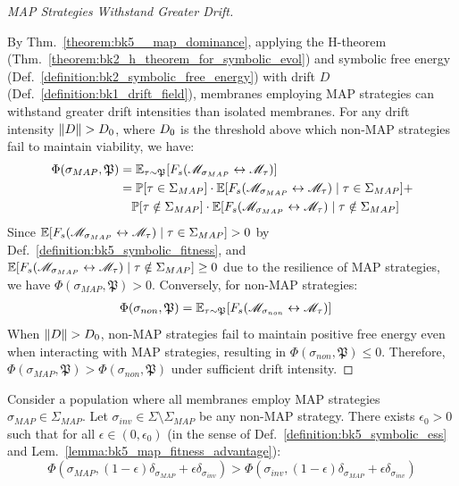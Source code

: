 \begin{proof}[MAP Strategies Withstand Greater Drift]
\label{proof:bk5_map_resistance_to_drift}
\leavevmode

By Thm.~\ref{theorem:bk5__map_dominance}, applying the H-theorem (Thm.~\ref{theorem:bk2_h_theorem_for_symbolic_evol}) and symbolic free energy (Def.~\ref{definition:bk2_symbolic_free_energy}) with drift $D$ (Def.~\ref{definition:bk1_drift_field}), membranes employing MAP strategies can withstand greater drift intensities than isolated membranes. For any drift intensity $\|D\| > D_0$, where $D_0$ is the threshold above which non-MAP strategies fail to maintain viability, we have:
\begin{align}
\Phi(\sigma_{MAP}, \mathfrak{P}) &= \mathbb{E}_{\tau \sim \mathfrak{P}}[F_s(\mathscr{M}_{\sigma_{MAP}} \leftrightarrow \mathscr{M}_\tau)] \\
&= \mathbb{P}[\tau \in \Sigma_{MAP}] \cdot \mathbb{E}[F_s(\mathscr{M}_{\sigma_{MAP}} \leftrightarrow \mathscr{M}_\tau) \mid \tau \in \Sigma_{MAP}] + \\
&\quad \mathbb{P}[\tau \notin \Sigma_{MAP}] \cdot \mathbb{E}[F_s(\mathscr{M}_{\sigma_{MAP}} \leftrightarrow \mathscr{M}_\tau) \mid \tau \notin \Sigma_{MAP}]
\end{align}
Since $\mathbb{E}[F_s(\mathscr{M}_{\sigma_{MAP}} \leftrightarrow \mathscr{M}_\tau) \mid \tau \in \Sigma_{MAP}] > 0$ by Def.~\ref{definition:bk5_symbolic_fitness}, and $\mathbb{E}[F_s(\mathscr{M}_{\sigma_{MAP}} \leftrightarrow \mathscr{M}_\tau) \mid \tau \notin \Sigma_{MAP}] \geq 0$ due to the resilience of MAP strategies, we have $\Phi(\sigma_{MAP}, \mathfrak{P}) > 0$.
Conversely, for non-MAP strategies:
\begin{align}
\Phi(\sigma_{non}, \mathfrak{P}) &= \mathbb{E}_{\tau \sim \mathfrak{P}}[F_s(\mathscr{M}_{\sigma_{non}} \leftrightarrow \mathscr{M}_\tau)]
\end{align}
When $\|D\| > D_0$, non-MAP strategies fail to maintain positive free energy even when interacting with MAP strategies, resulting in $\Phi(\sigma_{non}, \mathfrak{P}) \leq 0$.
Therefore, $\Phi(\sigma_{MAP}, \mathfrak{P}) > \Phi(\sigma_{non}, \mathfrak{P})$ under sufficient drift intensity.
\end{proof}
\begin{lemma}
\label{lemma:bk5_covenant_non_invasibility}
Consider a population where all membranes employ MAP strategies $\sigma_{MAP} \in \Sigma_{MAP}$. Let $\sigma_{inv} \in \Sigma \setminus \Sigma_{MAP}$ be any non-MAP strategy. There exists $\epsilon_0 > 0$ such that for all $\epsilon \in (0, \epsilon_0)$ (in the sense of Def.~\ref{definition:bk5_symbolic_ess} and Lem.~\ref{lemma:bk5_map_fitness_advantage}):
\begin{equation}
\Phi(\sigma_{MAP}, (1-\epsilon)\delta_{\sigma_{MAP}} + \epsilon\delta_{\sigma_{inv}}) > \Phi(\sigma_{inv}, (1-\epsilon)\delta_{\sigma_{MAP}} + \epsilon\delta_{\sigma_{inv}})
\end{equation}
\end{lemma}
